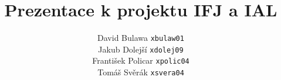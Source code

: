 \documentclass{beamer}
\title{Prezentace k projektu IFJ a IAL} %
\author[]{David Bulawa \texttt{xbulaw01} \\
	   Jakub Dolejší \texttt{xdolej09} \\
       František Policar \texttt{xpolic04} \\
       Tomáš Svěrák \texttt{xsvera04}}
\begin{document}
\begin{frame}
\titlepage %
\end{frame}



%
\end{document}
